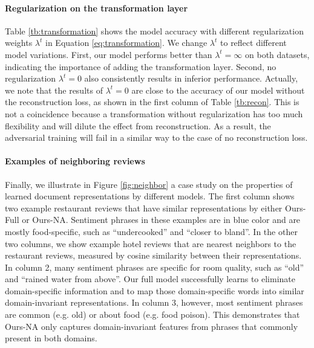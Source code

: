\paragraph{Regularization on the transformation layer} Table \ref{tb:transformation} shows the model accuracy with different regularization weights $\lambda^{t}$ in Equation \ref{eq:transformation}. We change  $\lambda^{t}$ to reflect different model variations. First, our model performs better than $\lambda^{t}=\infty$ on both datasets, indicating the importance of adding the transformation layer. Second, no regularization $\lambda^{t}=0$ also consistently results in inferior performance. Actually, we note that the results of $\lambda^{t}=0$ are close to the accuracy of our model without the reconstruction loss, as shown in the first column of Table \ref{tb:recon}. This is not a coincidence because a transformation without regularization has too much flexibility and will dilute the effect from reconstruction. As a result, the adversarial training will fail in a similar way to the case of no reconstruction loss.

\paragraph{Examples of neighboring reviews} Finally, we illustrate in Figure \ref{fig:neighbor} a case study on the properties of learned document representations by different models. The first column shows two example restaurant reviews that have similar representations by either Ours-Full or Ours-NA. Sentiment phrases in these examples are in blue color and are mostly food-specific, such as ``undercooked'' and ``closer to bland''. In the other two columns, we show example hotel reviews that are nearest neighbors to the restaurant reviews, measured by cosine similarity between their representations. In column 2, many sentiment phrases are specific for room quality, such as ``old'' and ``rained water from above''. Our full model successfully learns to eliminate domain-specific information and to map those domain-specific words into similar domain-invariant representations. In column 3, however, most sentiment phrases are common (e.g. old) or about food (e.g. food poison). This demonstrates that Ours-NA only captures domain-invariant features from phrases that commonly present in both domains. 

